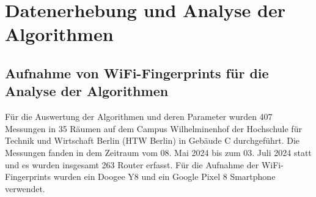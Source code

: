 \chapter{Datenerhebung und Analyse der Algorithmen} \label{datenerhebung_und_analyse}




\section{Aufnahme von WiFi-Fingerprints für die Analyse der Algorithmen} \label{datenerhebung}




Für die Auswertung der Algorithmen und deren Parameter wurden 407 Messungen in 35 Räumen auf dem Campus Wilhelminenhof der Hochschule für Technik und Wirtschaft Berlin (HTW Berlin) in Gebäude C durchgeführt. Die Messungen fanden in dem Zeitraum vom 08. Mai 2024 bis zum 03. Juli 2024 statt und es wurden insgesamt 263 Router erfasst. Für die Aufnahme der WiFi-Fingerprints wurden ein Doogee Y8 und ein Google Pixel 8 Smartphone verwendet.


